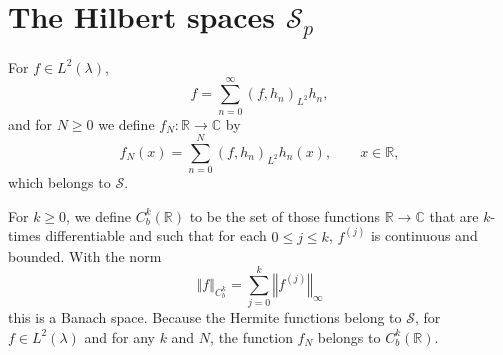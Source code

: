 \documentclass{article}
\newcommand{\norm}[1]{\left\Vert #1 \right\Vert}
\theoremstyle{definition}
\begin{document}
\section{The Hilbert spaces $\mathscr{S}_p$}
For $f \in L^2(\lambda)$,
\[
f = \sum_{n=0}^\infty (f,h_n)_{L^2}h_n,
\]
and for $N \geq 0$  we define $f_N:\mathbb{R} \to \mathbb{C}$ by
\[
f_N(x) = \sum_{n=0}^N (f,h_n)_{L^2}h_n(x),\qquad x \in \mathbb{R},
\]
which belongs to $\mathscr{S}$. 

For $k \geq 0$, we define $C_b^k(\mathbb{R})$ to be the set of those functions
$\mathbb{R} \to \mathbb{C}$ that are $k$-times differentiable and
 such that for each $0 \leq j \leq k$, $f^{(j)}$  is continuous and bounded. With the norm
\[
\norm{f}_{C_b^k} = \sum_{j=0}^k \norm{f^{(j)}}_\infty
\]
this is a Banach space. 
Because the Hermite functions belong to $\mathscr{S}$, for $f \in L^2(\lambda)$ and for any $k$ 
and $N$, the function $f_N$ belongs to $C_b^k(\mathbb{R})$.  
\end{document}
